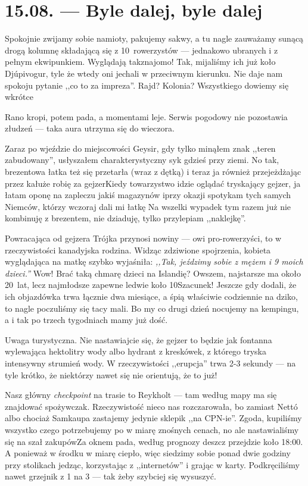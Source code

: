 \chapter*{15.08. --- Byle dalej, byle dalej}

Spokojnie zwijamy sobie namioty, pakujemy sakwy, a tu nagle zauważamy sunącą drogą kolumnę składającą się z 10~rowerzystów --- jednakowo ubranych i z pełnym ekwipunkiem. Wyglądają tak\textellipsis znajomo! Tak, mijaliśmy ich już koło Djúpivogur, tyle że wtedy oni jechali w przeciwnym kierunku. Nie daje nam spokoju pytanie ,,co to za impreza''. Rajd? Kolonia? Wszystkiego dowiemy się wkrótce\textellipsis

Rano kropi, potem pada, a momentami leje. Serwis pogodowy nie pozostawia złudzeń --- taka aura utrzyma się do wieczora.

Zaraz po wjeździe do miejscowości Geysir, gdy tylko minąłem znak ,,teren zabudowany'', usłyszałem charakterystyczny syk gdzieś przy ziemi. No tak, brezentowa łatka też się przetarła (wraz z dętką) i teraz ja również przejeżdżając przez kałuże robię za gejzer\textellipsis  Kiedy towarzystwo idzie oglądać tryskający gejzer, ja łatam oponę na zapleczu jakiś magazynów i\textellipsis przy okazji spotykam tych samych Niemców, którzy wczoraj dali mi łatkę \smile Na wszelki wypadek tym razem już nie kombinuję z brezentem, nie dziaduję, tylko przylepiam ,,naklejkę''.

Powracająca od gejzera Trójka przynosi nowiny --- owi pro-rowerzyści, to w rzeczywistości kanadyjska rodzina. Widząc zdziwione spojrzenia, kobieta wyglądająca na matkę szybko wyjaśniła: \emph{,,Tak, jeździmy sobie z mężem i 9 moich dzieci.''} Wow! Brać taką chmarę dzieci na Islandię? Owszem, najstarsze ma około 20~lat, lecz najmłodsze zapewne ledwie koło 10\textellipsis Sza\-cunek! Jeszcze gdy dodali, że ich objazdówka trwa łącznie dwa miesiące, a śpią właściwie codziennie na dziko, to nagle poczuliśmy się tacy mali. Bo my co drugi dzień nocujemy na kempingu, a i tak po trzech tygodniach mamy już dość.

Uwaga turystyczna. Nie nastawiajcie się, że gejzer to będzie jak fontanna wylewająca hektolitry wody albo hydrant z kreskówek, z którego tryska intensywny strumień wody. W rzeczywistości ,,erupcja'' trwa 2-3 sekundy --- na tyle krótko, że niektórzy nawet się nie orientują, że to już!

Nasz główny \emph{checkpoint} na trasie to Reykholt --- tam według mapy ma się znajdować spożywczak. Rzeczywistość nieco nas rozczarowała, bo zamiast Nettó albo chociaż Samkaupa zastajemy jedynie sklepik ,,na CPN-ie''. Zgoda, kupiliśmy wszystko czego potrzebujemy po w miarę znośnych cenach, no ale nastawialiśmy się na szał zakupów\textellipsis Za oknem pada, według prognozy deszcz przejdzie koło 18:00. A ponieważ w środku w miarę ciepło, więc siedzimy sobie ponad dwie godziny przy stolikach jedząc, korzystając z ,,internetów'' i grając w karty. Podkręciliśmy nawet grzejnik z 1 na 3 --- tak żeby szybciej się wysuszyć.

